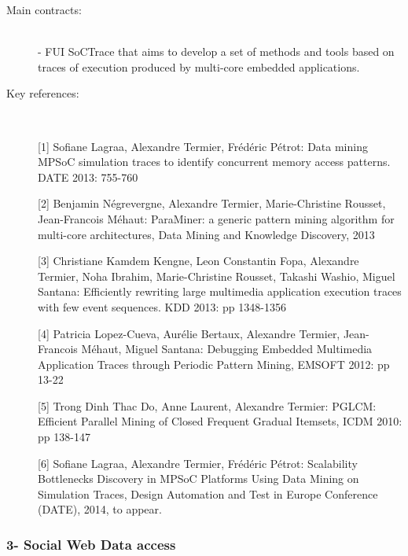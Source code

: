 \begin{description}

\item[Main contracts:] \ \\
- FUI SoCTrace that  aims to develop a set of methods and tools based on traces of execution produced by multi-core embedded applications. 
  
\item[Key references:]~%

[1] Sofiane Lagraa, Alexandre Termier, Fr{\'e}d{\'e}ric P{\'e}trot: Data mining MPSoC simulation traces to identify concurrent memory access patterns. DATE 2013: 755-760

[2] Benjamin N{\'e}grevergne, Alexandre Termier, Marie-Christine Rousset, Jean-Francois M{\'e}haut: ParaMiner: a generic pattern mining algorithm for multi-core architectures, Data Mining and Knowledge Discovery, 2013

[3] Christiane Kamdem Kengne, Leon Constantin Fopa, Alexandre Termier, Noha Ibrahim, Marie-Christine Rousset, Takashi Washio, Miguel Santana: Efficiently rewriting large multimedia application execution traces with few event sequences. KDD 2013: pp 1348-1356

[4] Patricia Lopez-Cueva, Aur{\'e}lie Bertaux, Alexandre Termier, Jean-Francois M{\'e}haut, Miguel Santana: Debugging Embedded Multimedia Application Traces through Periodic Pattern Mining, EMSOFT 2012: pp 13-22

[5] Trong Dinh Thac Do, Anne Laurent, Alexandre Termier: PGLCM: Efficient Parallel Mining of Closed Frequent Gradual Itemsets, ICDM 2010: pp 138-147

[6] Sofiane Lagraa, Alexandre Termier, Frédéric Pétrot: Scalability Bottlenecks Discovery in MPSoC Platforms Using Data Mining on Simulation Traces, Design Automation and Test in Europe Conference (DATE), 2014, to appear.

\end{description}

\subsubsection*{3- Social Web Data access}

